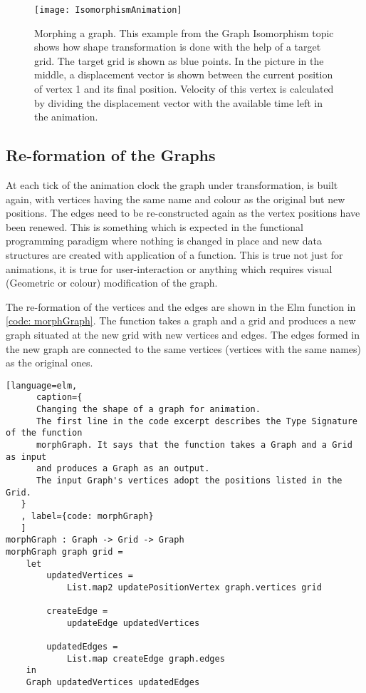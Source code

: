 \begin{figure}[h]
\centering
\texttt{[image: IsomorphismAnimation]}
\caption{
        Morphing a graph. This example from the Graph Isomorphism topic
        shows how shape transformation is done with the help of a target grid.
        The target grid is shown as blue points. In the picture in the middle,
        a displacement vector is shown between the current position of vertex 1
        and its final position. Velocity of this vertex is calculated by dividing
        the displacement vector with the available time left in the animation.
        }
\label{animationfigure: isomorphism}
\end{figure}

\subsection{Re-formation of the Graphs}
At each tick of the animation clock the graph under transformation, is built
again, with vertices having the same name and colour as the original but new
positions. The edges need to be re-constructed again as the vertex positions
have been renewed. This is something which is expected in the functional
programming paradigm where nothing is changed in place and new data structures
are created with application of a function. This is true not just for
animations, it is true for user-interaction or anything which requires visual
(Geometric or colour) modification of the graph.

The re-formation of the vertices and the edges are shown in
the Elm function in \autoref{code: morphGraph}. The function takes a
graph and a grid and produces a new graph situated at the new grid with new
vertices and edges. The edges formed in the new graph are connected to the
same vertices (vertices with the same names) as the original ones.

\begin{lstlisting}[language=elm, 
      caption={
      Changing the shape of a graph for animation.
      The first line in the code excerpt describes the Type Signature of the function
      morphGraph. It says that the function takes a Graph and a Grid as input
      and produces a Graph as an output.
      The input Graph's vertices adopt the positions listed in the Grid.
   }
   , label={code: morphGraph}
   ]
morphGraph : Graph -> Grid -> Graph
morphGraph graph grid =
    let
        updatedVertices =
            List.map2 updatePositionVertex graph.vertices grid

        createEdge =
            updateEdge updatedVertices

        updatedEdges =
            List.map createEdge graph.edges
    in
    Graph updatedVertices updatedEdges

\end{lstlisting}

